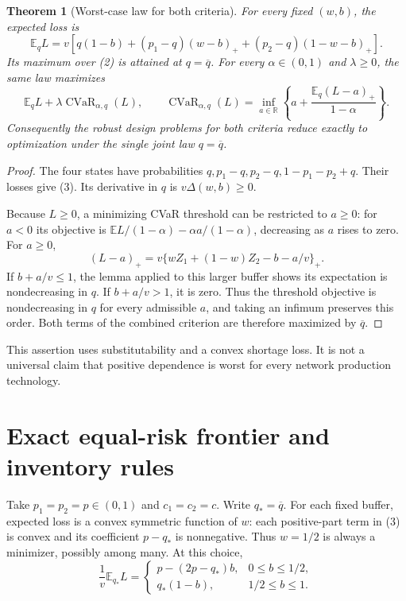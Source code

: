 \documentclass[11pt,a4paper]{article}
\newtheorem{theorem}{Theorem}[section]
\theoremstyle{definition}
\theoremstyle{remark}
\newcommand{\R}{\mathbb R}
\newcommand{\E}{\mathbb E}
\begin{document}
\begin{theorem}[Worst-case law for both criteria]
For every fixed $(w,b)$, the expected loss is
\[
 \E_qL=v\left[q(1-b)+(p_1-q)(w-b)_+
                       +(p_2-q)(1-w-b)_+\right]. \tag{3}
\]
Its maximum over (2) is attained at $q=\overline q$. For every $\alpha\in(0,1)$ and $\lambda\ge0$, the same law maximizes
\[
 \E_qL+\lambda\operatorname{CVaR}_{\alpha,q}(L),
 \qquad
 \operatorname{CVaR}_{\alpha,q}(L)=
 \inf_{a\in\R}\left\{a+\frac{\E_q(L-a)_+}{1-\alpha}\right\}.
\]
Consequently the robust design problems for both criteria reduce exactly to optimization under the single joint law $q=\overline q$.
\end{theorem}
\begin{proof}
The four states have probabilities $q,p_1-q,p_2-q,1-p_1-p_2+q$. Their losses give (3). Its derivative in $q$ is $v\Delta(w,b)\ge0$.

Because $L\ge0$, a minimizing CVaR threshold can be restricted to $a\ge0$: for $a<0$ its objective is $\E L/(1-\alpha)-\alpha a/(1-\alpha)$, decreasing as $a$ rises to zero. For $a\ge0$,
\[
 (L-a)_+=v\{wZ_1+(1-w)Z_2-b-a/v\}_+.
\]
If $b+a/v\le1$, the lemma applied to this larger buffer shows its expectation is nondecreasing in $q$. If $b+a/v>1$, it is zero. Thus the threshold objective is nondecreasing in $q$ for every admissible $a$, and taking an infimum preserves this order. Both terms of the combined criterion are therefore maximized by $\overline q$.
\end{proof}

This assertion uses substitutability and a convex shortage loss. It is not a universal claim that positive dependence is worst for every network production technology.
\section{Exact equal-risk frontier and inventory rules}
Take $p_1=p_2=p\in(0,1)$ and $c_1=c_2=c$. Write $q_* =\overline q$. For each fixed buffer, expected loss is a convex symmetric function of $w$: each positive-part term in (3) is convex and its coefficient $p-q_*$ is nonnegative. Thus $w=1/2$ is always a minimizer, possibly among many. At this choice,
\[
 \frac1v\E_{q_*}L=
 \begin{cases}
 p-(2p-q_*)b,&0\le b\le1/2,\\
 q_*(1-b),&1/2\le b\le1.
 \end{cases} \tag{4}
\]
\end{document}
